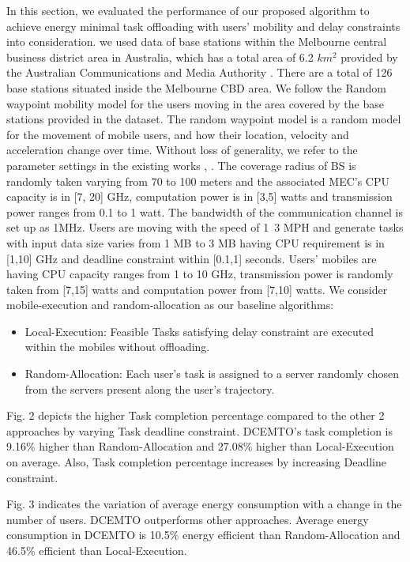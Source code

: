 \documentclass[conference]{IEEEtran}
\begin{document}
In this section, we evaluated the performance of our proposed algorithm to achieve energy minimal task offloading with users’ mobility and delay constraints into consideration. we used data of base stations within the Melbourne central business district area in Australia, which has a total area of 6.2 $km^2$ provided by the Australian Communications and Media Authority \cite{b6}. There are a total of 126 base stations situated inside the Melbourne CBD area.
	We follow the Random waypoint mobility model for the users moving in the area covered by the base stations provided in the dataset. The random waypoint model is a random model for the movement of mobile users, and how their location, velocity and acceleration change over time. 
	Without loss of generality, we refer to the parameter settings in the existing works \cite{b2}, \cite{b7}. The coverage radius of BS is randomly taken varying from 70 to 100 meters and the associated MEC’s CPU capacity is in [7, 20] GHz, computation power is in [3,5] watts and transmission power ranges from 0.1 to 1 watt. The bandwidth of the communication channel is set up as 1MHz. Users are moving with the speed of 1~3 MPH and generate tasks with input data size varies from 1 MB to 3 MB having CPU requirement is in [1,10] GHz and deadline constraint within [0.1,1] seconds. Users’ mobiles are having CPU capacity ranges from 1 to 10 GHz, transmission power is randomly taken from [7,15] watts and computation power from [7,10] watts. We consider mobile-execution and random-allocation as our baseline algorithms:
	


\begin{itemize}
\item Local-Execution: Feasible Tasks satisfying delay constraint are executed within the mobiles without offloading. 
\item Random-Allocation: Each user’s task is assigned to a server randomly chosen from the servers present along the user’s trajectory.
\end{itemize}


 
Fig. 2 depicts the higher Task completion percentage compared to the other 2 approaches by varying Task deadline constraint. DCEMTO’s task completion is 9.16\% higher than Random-Allocation and 27.08\% higher than Local-Execution on average. Also, Task completion percentage increases by increasing Deadline constraint.

	Fig. 3 indicates the variation of average energy consumption with a change in the number of users. DCEMTO outperforms other approaches. Average energy consumption in DCEMTO is 10.5\% energy efficient than Random-Allocation and 46.5\% efficient than Local-Execution. 
\end{document}

